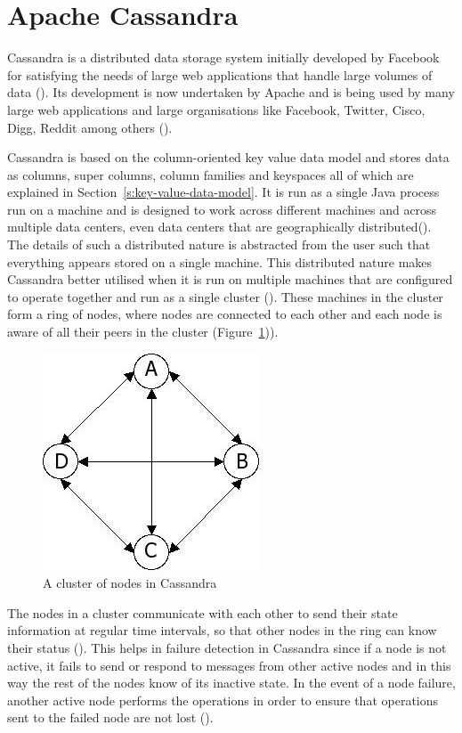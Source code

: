 \section{Apache Cassandra} \label{s:Background-Cassandra}

Cassandra is a distributed data storage system initially developed by Facebook
for satisfying the needs of large web applications that handle large
volumes of data (). 
Its development is now undertaken by Apache  and is being used by
many large web applications and large organisations like Facebook,  Twitter, 
Cisco,  Digg,  Reddit among others (). 

Cassandra is based on the column-oriented key value data model and stores data
as columns,  super columns,  column families and keyspaces all of which are
explained in Section~\ref{s:key-value-data-model}. It is run as a single Java
process run on a machine and is designed to work  across different machines and
across multiple data centers,  even data centers that are geographically
distributed().  The details of such a distributed nature is
abstracted from  the user such that everything appears stored on a single
machine.  This distributed nature makes Cassandra better utilised when it is run
on multiple machines that are configured to operate together and run as a single
cluster  ().  These machines in the cluster form a ring
of nodes,  where nodes are connected to each other and each node is aware of all
their peers in the cluster (Figure~\ref{f:cassandra-cluster})). 


\begin{figure}[h] \centering 
\includegraphics[width=.3\textwidth]{./figure/Cassandra/Cassandra-cluster.png}
	\caption{A cluster of nodes in Cassandra}\label{f:cassandra-cluster}
\end{figure}

The nodes in a cluster communicate with each other to send their state
information at regular time intervals,  so that other nodes in the ring can know
their status ().  This helps in failure detection in
Cassandra since if a node is not active,  it fails to send or respond to messages
from other active nodes and in this way the rest of the nodes  know of its
inactive state.  In the event of a node failure,  another active node  performs
the operations in order to ensure that  operations  sent to the failed node are
not lost (). 

